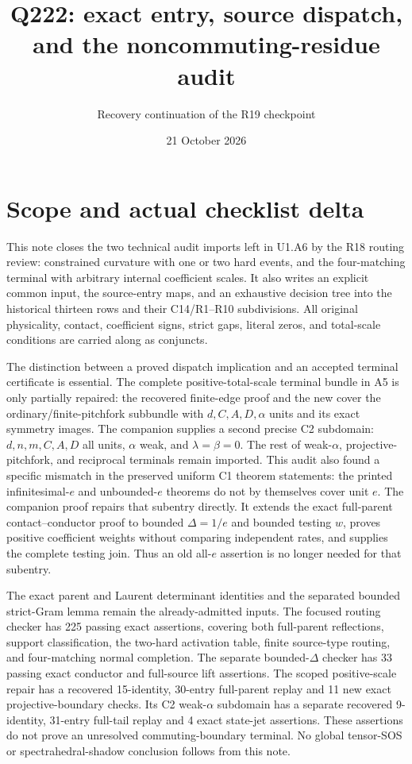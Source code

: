 \documentclass[11pt]{article}
\title{Q222: exact entry, source dispatch, and the noncommuting-residue audit}
\author{Recovery continuation of the R19 checkpoint}
\date{21 October 2026}
\begin{document}
\maketitle

\section*{Scope and actual checklist delta}

This note closes the two technical audit imports left in U1.A6 by the
R18 routing review: constrained curvature with one or two hard events,
and the four-matching terminal with arbitrary internal coefficient
scales. It also writes an explicit common input, the source-entry maps,
and an exhaustive decision tree into the historical thirteen rows and
their C14/R1--R10 subdivisions. All original physicality, contact,
coefficient signs, strict gaps, literal zeros, and total-scale conditions
are carried along as conjuncts.

The distinction between a proved dispatch implication and an accepted
terminal certificate is essential. The complete positive-total-scale
terminal bundle in A5 is only partially repaired: the recovered finite-edge
proof and the new  cover the
ordinary/finite-pitchfork subbundle with $d,C,A,D,\alpha$ units and its
exact symmetry images. The companion
 supplies a second precise
C2 subdomain: $d,n,m,C,A,D$ all units, $\alpha$ weak, and
$\lambda=\beta=0$. The rest of weak-$\alpha$, projective-pitchfork,
and reciprocal terminals remain imported. This audit also
found a specific mismatch in the preserved uniform C1 theorem statements:
the printed infinitesimal-$e$ and unbounded-$e$ theorems do not by
themselves cover unit $e$. The companion proof
 repairs that subentry directly.
It extends the exact full-parent contact--conductor proof to bounded
$\Delta=1/e$ and bounded testing $w$, proves positive coefficient weights
without comparing independent rates, and supplies the complete testing
join. Thus an old all-$e$ assertion is no longer needed for that subentry.

The exact parent and Laurent determinant identities and the separated
bounded strict-Gram lemma remain the already-admitted inputs. The
focused routing checker has 225 passing exact assertions, covering both full-parent
reflections, support
classification, the two-hard activation table, finite source-type
routing, and four-matching normal completion. The separate bounded-$\Delta$
checker has 33 passing exact conductor and full-source lift assertions.
The scoped positive-scale repair has a recovered 15-identity, 30-entry
full-parent replay and 11 new exact projective-boundary checks.
Its C2 weak-$\alpha$ subdomain has a separate recovered 9-identity,
31-entry full-tail replay and 4 exact state-jet assertions.
These assertions do not
prove an unresolved commuting-boundary terminal. No global tensor-SOS
or spectrahedral-shadow conclusion follows from this note.
\end{document}
